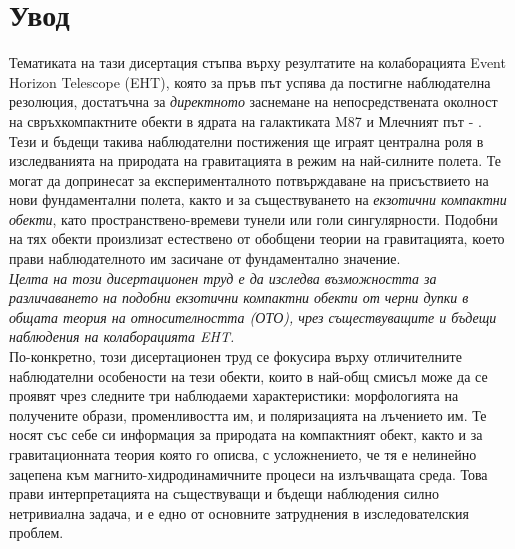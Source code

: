 \documentclass[12pt]{article}
\numberwithin{equation}{section}
\numberwithin{figure}{section}
\begin{document}
\nocite{EHT_M87_I,
	EHT_M87_II,
	EHT_M87_III,
	EHT_M87_IV,
	EHT_M87_V,
	EHT_M87_VI,
	EHT_M87_VII,
	EHT_M87_VIII,
	EHT_M87_IX,
	EHT_SGR_I,
	EHT_SGR_II,
	EHT_SGR_III,
	EHT_SGR_IV,
	EHT_SGR_V,
	EHT_SGR_VI,
	EHT_SGR_VII,
	EHT_SGR_VIII}
	
	\tableofcontents
	\listoffigures
	\listoftables
	\newpage
	\section{Увод}
	
	
	
	Тематиката на тази дисертация стъпва върху резултатите на колаборацията Event Horizon Telescope (EHT), която за пръв път успява да постигне наблюдателна резолюция, достатъчна за \emph{директното} заснемане на непосредствената околност на свръхкомпактните обекти в ядрата на галактиката M87 и Млечният път \cite{EHT_M87_I} - \cite{EHT_SGR_VIII}. Тези и бъдещи такива наблюдателни постижения ще играят централна роля в изследванията на природата на гравитацията в режим на най-силните полета. Те могат да допринесат за експерименталното потвърждаване на присъствието на нови фундаментални полета, както и за съществуването на \emph{екзотични компактни обекти}, като пространствено-времеви тунели или голи сингулярности. Подобни на тях обекти произлизат естествено от обобщени теории на гравитацията, което прави наблюдателното им засичане от фундаментално значение.\\
	
	\emph{Целта на този дисертационен труд е да изследва възможността за различаването на подобни екзотични компактни обекти от черни дупки в общата теория на относителността (ОТО), чрез съществуващите и бъдещи наблюдения на колаборацията EHT.}\\
	
	\noindent По-конкретно, този дисертационен труд се фокусира върху отличителните наблюдателни особености на тези обекти, които в най-общ смисъл може да се проявят чрез следните три наблюдаеми характеристики: морфологията на получените образи, променливостта им, и поляризацията на лъчението им. Те носят със себе си информация за природата на компактният обект, както и за гравитационната теория която го описва, с усложнението, че тя е нелинейно зацепена към магнито-хидродинамичните процеси на излъчващата среда. Това прави интерпретацията на съществуващи и бъдещи наблюдения силно нетривиална задача, и е едно от основните затруднения в изследователския проблем.\\
	
\end{document}
